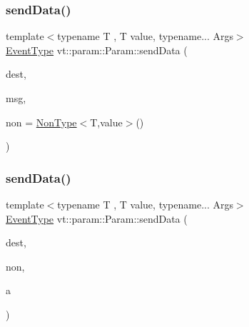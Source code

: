 \subsubsection{\texorpdfstring{send\+Data()}{sendData()}\hspace{0.1cm}{\footnotesize\ttfamily [2/7]}}
{\footnotesize\ttfamily template$<$typename T , T value, typename... Args$>$ \\
\hyperlink{namespacevt_a009267401def7ae8bf201892222d060f}{Event\+Type} vt\+::param\+::\+Param\+::send\+Data (\begin{DoxyParamCaption}\item[{\hyperlink{namespacevt_a866da9d0efc19c0a1ce79e9e492f47e2}{Node\+Type} const \&}]{dest,  }\item[{\hyperlink{structvt_1_1param_1_1_data_msg}{Data\+Msg}$<$ std\+::tuple$<$ Args... $>$$>$ $\ast$}]{msg,  }\item[{\hyperlink{structvt_1_1param_1_1_non_type}{Non\+Type}$<$ T, value $>$ \+\_\+\+\_\+attribute\+\_\+\+\_\+((unused))}]{non = {\ttfamily \hyperlink{structvt_1_1param_1_1_non_type}{Non\+Type}$<$T,value$>$()} }\end{DoxyParamCaption})\hspace{0.3cm}{\ttfamily [inline]}}

\mbox{\label{structvt_1_1param_1_1_param_a18098e4b5fe1dbf053db7d8d8d3317d8}} 
\subsubsection{\texorpdfstring{send\+Data()}{sendData()}\hspace{0.1cm}{\footnotesize\ttfamily [3/7]}}
{\footnotesize\ttfamily template$<$typename T , T value, typename... Args$>$ \\
\hyperlink{namespacevt_a009267401def7ae8bf201892222d060f}{Event\+Type} vt\+::param\+::\+Param\+::send\+Data (\begin{DoxyParamCaption}\item[{\hyperlink{namespacevt_a866da9d0efc19c0a1ce79e9e492f47e2}{Node\+Type} const \&}]{dest,  }\item[{\hyperlink{structvt_1_1param_1_1_non_type}{Non\+Type}$<$ T, value $>$ \+\_\+\+\_\+attribute\+\_\+\+\_\+((unused))}]{non,  }\item[{Args \&\&...}]{a }\end{DoxyParamCaption})\hspace{0.3cm}{\ttfamily [inline]}}

